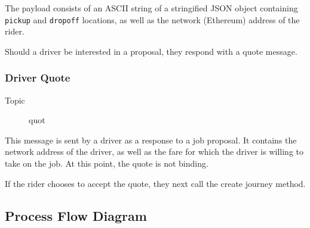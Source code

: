 The payload consists of an ASCII string of a stringified JSON object containing \lstinline{pickup} and \lstinline{dropoff} locations, as well as the network (Ethereum) address of the rider.



Should a driver be interested in a proposal, they respond with a quote message.

\subsubsection{Driver Quote}

\begin{description}
	\item [Topic] quot
\end{description}

This message is sent by a driver as a response to a job proposal. It contains the network address of the driver, as well as the fare for which the driver is willing to take on the job. At this point, the quote is not binding.



If the rider chooses to accept the quote, they next call the create journey method.

\subsection{Process Flow Diagram}

